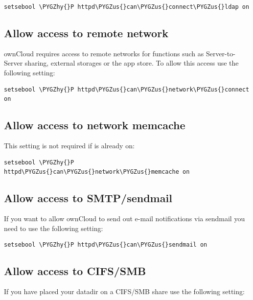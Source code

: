 \documentclass[letterpaper,10pt,english]{sphinxmanual}
\def\PYGZus{\char`\_}
\def\PYGZhy{\char`\-}
\begin{document}
\begin{Verbatim}[commandchars=\\\{\}]
setsebool \PYGZhy{}P httpd\PYGZus{}can\PYGZus{}connect\PYGZus{}ldap on
\end{Verbatim}


\subsection{Allow access to remote network}
\label{installation/selinux_configuration:allow-access-to-remote-network}
ownCloud requires access to remote networks for functions such as Server-to-Server sharing, external storages or
the app store. To allow this access use the following setting:

\begin{Verbatim}[commandchars=\\\{\}]
setsebool \PYGZhy{}P httpd\PYGZus{}can\PYGZus{}network\PYGZus{}connect on
\end{Verbatim}


\subsection{Allow access to network memcache}
\label{installation/selinux_configuration:allow-access-to-network-memcache}
This setting is not required if  is already on:

\begin{Verbatim}[commandchars=\\\{\}]
setsebool \PYGZhy{}P httpd\PYGZus{}can\PYGZus{}network\PYGZus{}memcache on
\end{Verbatim}


\subsection{Allow access to SMTP/sendmail}
\label{installation/selinux_configuration:allow-access-to-smtp-sendmail}
If you want to allow ownCloud to send out e-mail notifications via sendmail you need
to use the following setting:

\begin{Verbatim}[commandchars=\\\{\}]
setsebool \PYGZhy{}P httpd\PYGZus{}can\PYGZus{}sendmail on
\end{Verbatim}


\subsection{Allow access to CIFS/SMB}
\label{installation/selinux_configuration:allow-access-to-cifs-smb}
If you have placed your datadir on a CIFS/SMB share use the following setting:
\end{document}
